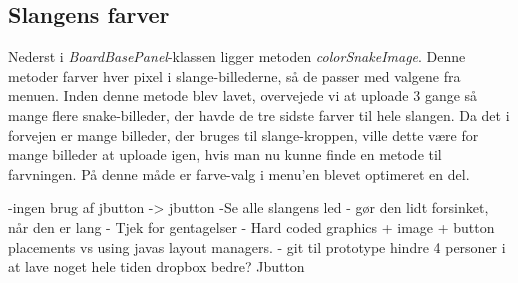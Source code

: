 \subsection{Slangens farver}
Nederst i \textit{BoardBasePanel}-klassen ligger metoden \textit{colorSnakeImage}. Denne metoder farver hver pixel i slange-billederne, så de passer med valgene fra menuen. 
Inden denne metode blev lavet, overvejede vi at uploade 3 gange så mange flere snake-billeder, der havde de tre sidste farver til hele slangen. Da det i forvejen er mange billeder, der bruges til slange-kroppen, ville dette være for mange billeder at uploade igen, hvis man nu kunne finde en metode til farvningen.
På denne måde er farve-valg i menu'en blevet optimeret en del.

-ingen brug af jbutton -> jbutton
-Se alle slangens led - gør den lidt forsinket, når den er lang
- Tjek for gentagelser
- Hard coded graphics + image + button placements    vs    using javas layout managers.
- git til prototype 
	hindre 4 personer i at lave noget hele tiden
	dropbox bedre?
Jbutton
